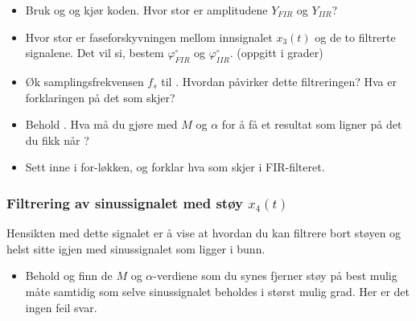   \begin{itemize}
  \item  Bruk   og   og kjør
    koden. Hvor stor er amplitudene $Y_{FIR}$ og $Y_{IIR}$?
  \item Hvor stor er faseforskyvningen mellom
    innsignalet $x_{3}(t)$ og de to filtrerte signalene. Det vil si,
    bestem $\varphi_{FIR}^{\circ}$ og
    $\varphi_{IIR}^{\circ}$. (oppgitt i grader) 
  
  \item Øk samplingsfrekvensen $f_s$ til .
    Hvordan påvirker dette filtreringen? Hva er forklaringen
  på det som skjer? 
\item Behold . Hva må du gjøre med
  $M$ og $\alpha$ for å få et resultat som ligner på det du fikk når
  ?
  
\item Sett  inne i
  for-løkken, og forklar hva som skjer i FIR-filteret.


\end{itemize}

\subsubsection*{\bf Filtrering av sinussignalet med støy $x_{4}(t)$}
   Hensikten med dette signalet er å vise at hvordan
  du kan filtrere bort støyen og helst sitte igjen med sinussignalet som
  ligger i bunn.   

  \begin{itemize}
  \item 
  Behold  og finn de $M$ og $\alpha$-verdiene som
  du synes fjerner støy på best mulig måte samtidig som selve
  sinussignalet beholdes i  størst mulig grad. Her er det ingen feil svar.
  \end{itemize}
  
